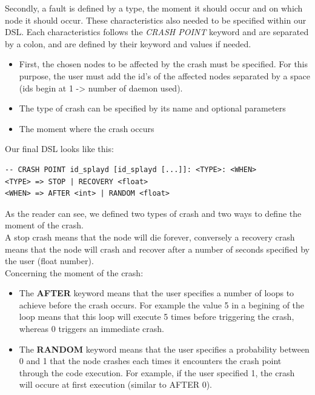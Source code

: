 \documentclass{eplmastersthesis}
\begin{document}
          Secondly, a fault is defined by a type, the moment it should occur and
          on which node it should occur. These characteristics also needed to
          be specified within our DSL. Each characteristics follows the
          \textit{CRASH POINT} keyword and are separated by a colon, and are
          defined by their keyword and values if needed.

          \begin{itemize}
            \item First, the chosen nodes to be affected by the crash must be
            specified. For this purpose, the user must add the id's of the
            affected nodes separated by a space (ids begin at 1 -> number of
            daemon used).
            \item The type of crash can be specified by its name and optional
            parameters
            \item The moment where the crash occurs
          \end{itemize}

          Our final DSL looks like this:

          \begin{lstlisting}[style=MyBash]
-- CRASH POINT id_splayd [id_splayd [...]]: <TYPE>: <WHEN>
<TYPE> => STOP | RECOVERY <float>
<WHEN> => AFTER <int> | RANDOM <float>
          \end{lstlisting}

          As the reader can see, we defined two types of crash and two ways to
          define the moment of the crash.\\
          A stop crash means that the node will die forever, conversely a
          recovery crash means that the node will crash and recover after a
          number of seconds specified by the user (float number).\\
          Concerning the moment of the crash:
          \begin{itemize}
            \item The \textbf{AFTER} keyword means that the user specifies a
            number of loops to achieve before the crash occurs. For example
            the value 5 in a begining of the loop means that this loop will
            execute 5 times before triggering the crash, whereas 0 triggers
            an immediate crash.
            \item The \textbf{RANDOM} keyword means that the user specifies a
            probability between 0 and 1 that the node crashes each times it
            encounters the crash point through the code execution. For example,
            if the user specified 1, the crash will occure at first execution
            (similar to AFTER 0).
          \end{itemize}
\end{document}
